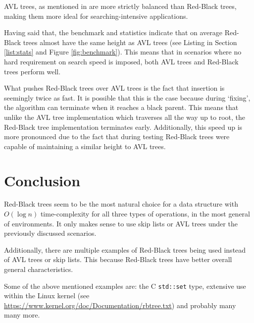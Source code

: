 \documentclass[article]{uom-coursework}
\def\CC{{C\nolinebreak\raisebox{.25ex}{\scriptsize\bfseries{++}}}}
\begin{document}
AVL trees, as mentioned in \textcite{wikiavltree} are
more strictly balanced than Red-Black trees, making
them more ideal for searching-intensive applications.

Having said that, the benchmark and statistics indicate that on
average Red-Black trees almost have the same height as AVL trees
(see Listing in Section \ref{list:stats} and Figure
\ref{fig:benchmark}). This means that in scenarios where no hard
requirement on search speed is imposed, both AVL trees and
Red-Black trees perform well.

What pushes Red-Black trees over AVL trees is the fact that
insertion is seemingly twice as fast. It is possible that this
is the case because during `fixing', the algorithm can terminate
when it reaches a black parent. This means that unlike the AVL
tree implementation which traverses all the way up to root, the
Red-Black tree implementation terminates early. Additionally,
this speed up is more pronounced due to the fact that during
testing Red-Black trees were capable of maintaining a similar
height to AVL trees.

\section{Conclusion}

Red-Black trees seem to be the most natural choice for a data
structure with $O(\log n)$ time-complexity for all three types
of operations, in the most general of environments. It only
makes sense to use skip lists or AVL trees under the previously
discussed scenarios. 

Additionally, there are multiple examples of Red-Black trees
being used instead of AVL trees or skip lists. This because
Red-Black trees have better overall general characteristics.

Some of the above mentioned examples are: the \CC{}
\texttt{std::set} type, extensive use within the Linux kernel
(see \url{https://www.kernel.org/doc/Documentation/rbtree.txt})
and probably many many more.

\printbibliography
\end{document}
